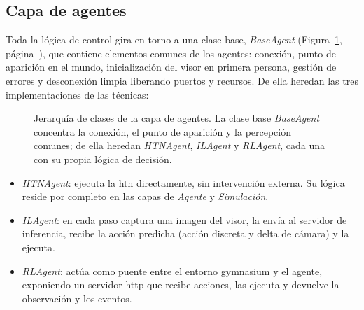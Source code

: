 \subsection{Capa de agentes}
Toda la lógica de control gira en torno a una clase base,
\textit{BaseAgent} (Figura~\ref{fig:base-agent}, página~\pageref{fig:base-agent}),
que contiene elementos comunes de los agentes: conexión, punto de aparición en el mundo,
inicialización del visor en primera persona, gestión de errores y desconexión limpia liberando puertos y
recursos. De ella heredan las tres implementaciones de las técnicas:

\begin{figure}[htbp]
  \centering
  \caption[Jerarquía de clases de la capa de agentes]{Jerarquía de clases de la
  capa de agentes. La clase base \textit{BaseAgent} concentra la conexión, el
  punto de aparición y la percepción comunes; de ella heredan \textit{HTNAgent},
  \textit{ILAgent} y \textit{RLAgent}, cada una con su propia lógica de decisión.}
  \label{fig:base-agent}
\end{figure}

\begin{itemize}
  \item \textit{HTNAgent}: ejecuta la \gls{htn}
        directamente, sin intervención externa. Su lógica reside por
        completo en las capas de \textit{Agente} y \textit{Simulación}.
  \item \textit{ILAgent}: en cada paso captura una imagen del visor, la envía al
        servidor de inferencia, recibe la acción predicha (acción discreta
        y delta de cámara) y la ejecuta.
  \item \textit{RLAgent}: actúa como puente entre el entorno \gls{gymnasium} y el agente,
        exponiendo un servidor \acrshort{http} que recibe acciones, las ejecuta y devuelve la
        observación y los eventos.
\end{itemize}

